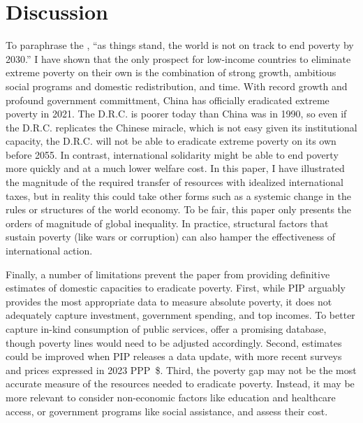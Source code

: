 \section{Discussion\label{sec:conclusion}} 

To paraphrase the \cite{un_sustainable_2022}, ``as things stand, the world is not on track to end poverty by 2030.'' I have shown that the only prospect for low-income countries to eliminate extreme poverty on their own is the combination of strong growth, ambitious social programs and domestic redistribution, and time. 
With record growth and profound government committment, China has officially eradicated extreme poverty in 2021. The D.R.C. is poorer today than China was in 1990, %
so even if the D.R.C. replicates the Chinese miracle, which is not easy given its institutional capacity, the D.R.C. will not be able to eradicate extreme poverty on its own before 2055. %
In contrast, international solidarity might be able to end poverty more quickly and at a much lower welfare cost. In this paper, I have illustrated the magnitude of the required transfer of resources with idealized international taxes, but in reality this could take other forms such as a systemic change in the rules or structures of the world economy. 
To be fair, this paper only presents the orders of magnitude of global inequality. %
In practice, structural factors that sustain poverty (like wars or corruption) %
can also hamper the effectiveness of international action. %

Finally, a number of limitations prevent the paper from providing definitive estimates of domestic capacities to eradicate poverty. First, while PIP arguably provides the most appropriate data to measure absolute poverty, it does not adequately capture investment, government spending, and top incomes. To better capture in-kind consumption of public services, \cite{fisher-post_government_2023} offer a promising database, though poverty lines would need to be adjusted accordingly. Second, estimates could be improved when PIP releases a data update, with more recent surveys and prices expressed in 2023 PPP~\$. Third, the poverty gap may not be the most accurate measure of the resources needed to eradicate poverty. Instead, it may be more relevant to consider non-economic factors like education and healthcare access, or government programs like social assistance, and assess their cost.


